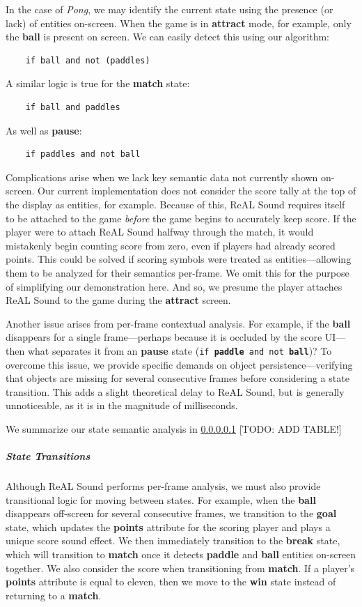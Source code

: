 \documentclass{report}
\newcommand{\rs}{ReAL Sound\xspace}
\newcommand{\state}[1]{\textbf{#1}}
\newcommand{\pad}{\textbf{paddle}\xspace}
\newcommand{\ball}{\textbf{ball}\xspace}
\newcommand{\tech}[1]{\textbf{#1}}
\begin{document}
In the case of \emph{Pong}, we may identify the current state using the presence (or lack) of entities on-screen. When the game is in \state{attract} mode, for example, only the \ball is present on screen. We can easily detect this using our algorithm: 

\begin{lstlisting}
    if ball and not (paddles)
\end{lstlisting}

A similar logic is true for the \state{match} state:

\begin{lstlisting}
    if ball and paddles
\end{lstlisting}

As well as \state{pause}:

\begin{lstlisting}
    if paddles and not ball
\end{lstlisting}

Complications arise when we lack key semantic data not currently shown on-screen. Our current implementation does not consider the score tally at the top of the display as entities, for example. Because of this, \rs requires itself to be attached to the game \emph{before} the game begins to accurately keep score. If the player were to attach \rs halfway through the match, it would mistakenly begin counting score from zero, even if players had already scored points. This could be solved if scoring symbols were treated as entities---allowing them to be analyzed for their semantics per-frame. We omit this for the purpose of simplifying our demonstration here. And so, we presume the player attaches \rs to the game during the \state{attract} screen. 

Another issue arises from per-frame contextual analysis. For example, if the \ball disappears for a single frame---perhaps because it is occluded by the score UI---then what separates it from an \state{pause} state (\texttt{if \pad and not \ball})? To overcome this issue, we provide specific demands on object persistence---verifying that objects are missing for several consecutive frames before considering a state transition. This adds a slight theoretical delay to \rs, but is generally unnoticeable, as it is in the magnitude of milliseconds.



We summarize our state semantic analysis in \ref{} [TODO: ADD TABLE!]


\subparagraph{State Transitions}
Although \rs performs per-frame analysis, we must also provide transitional logic for moving between states. For example, when the \ball disappears off-screen for several consecutive frames, we transition to the \state{goal} state, which updates the \tech{points} attribute for the scoring player and plays a unique score sound effect. We then immediately transition to the \state{break} state, which will transition to \state{match} once it detects \pad and \ball entities on-screen together. We also consider the score when transitioning from \state{match}. If a player's \state{points} attribute is equal to eleven, then we move to the \state{win} state instead of returning to a \state{match}.
\end{document}
